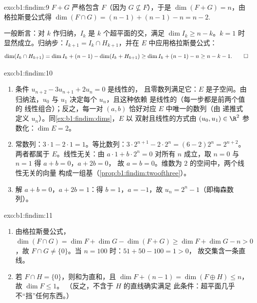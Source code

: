 \begin{solution}{exo:b1:findim:9}
$F + G$ 严格包含 $F$（因为 $G \not\subseteq F$），于是
$\dim(F + G) = n$，由格拉斯曼公式得 $\dim(F \cap G) = (n-1) +
(n-1) - n = n - 2$.

一般断言：对 $k$ 作归纳，$I_k$ 是 $k$
个超平面的交，满足 $\dim I_k \geq n - k$。$k = 1$ 时显然成立。归纳步：$I_{k+1}
= I_k \cap H_{k+1}$，并在 $E$ 中应用格拉斯曼公式：
\[
\dim(I_k \cap H_{k+1}) = \dim I_k + (n - 1) - \dim(I_k + H_{k+1})
\geq \dim I_k + (n-1) - n \geq n - k - 1 . \qedhere
\]
\end{solution}

\begin{solution}{exo:b1:findim:10}
\begin{enumerate}
  \item 条件 $u_{n+2} - 3u_{n+1} + 2u_n = 0$ 是线性的，
        且零数列满足它：$E$ 是子空间。由
        归纳法，$u_0$ 与 $u_1$ 决定每个 $u_n$，且这种依赖
        是线性的（每一步都是前两个值的
        线性组合）；反之，每一对 $(a, b)$
        恰好对应 $E$ 中唯一的数列（由
        递推式定义 $u_n$）。同\cref{ex:b1:findim:dims}，$E$ 以
        双射且线性的方式由 $(u_0, u_1) \in
        \R^2$ 参数化：$\dim E = 2$。
  \item 常数列：$3\cdot1 - 2\cdot1 = 1$。等比数列：$3\cdot
        2^{n+1} - 2\cdot 2^n = (6 - 2)2^n = 2^{n+2}$。两者都属于
        $E$。线性无关：由 $a\cdot 1 + b\cdot 2^n = 0$ 对所有 $n$
        成立，取 $n = 0$ 与 $n = 1$ 得 $a + b = 0$，$a + 2b = 0$，
        故 $a = b = 0$。维数为 $2$ 的空间中，两个线性无关的向量
        构成一组基（\cref{prop:b1:findim:twoofthree}）。
  \item 解 $a + b = 0$，$a + 2b = 1$：得 $b = 1$，$a = -1$，故
        $u_n = 2^n - 1$（即梅森数列）。
\end{enumerate}
\end{solution}

\begin{solution}{exo:b1:findim:11}
\begin{enumerate}
  \item 由格拉斯曼公式，$\dim(F \cap G) = \dim F + \dim G - \dim(F +
        G) \geq \dim F + \dim G - n > 0$，故 $F \cap G \neq
        \{0\}$。当 $n = 100$ 时：$51 + 50 - 100 = 1 > 0$，
        故交集含一条直线。
  \item 若 $F \cap H = \{0\}$，则和为直和，且 $\dim F +
        (n - 1) = \dim(F \oplus H) \leq n$，故 $\dim F \leq 1$。
        （反之，不含于 $H$ 的直线确实满足
        此条件：超平面几乎不“挡”任何东西。）
\end{enumerate}
\end{solution}

